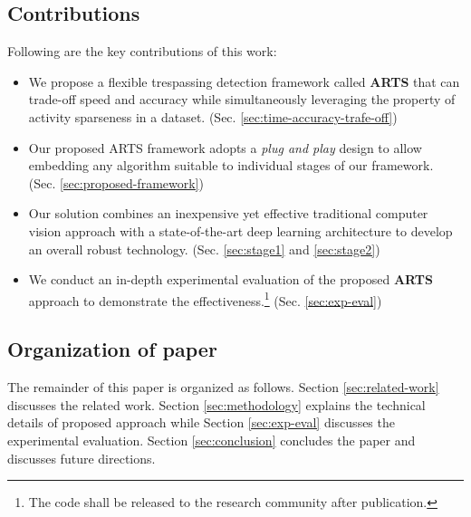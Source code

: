 \subsection{Contributions}
Following are the key contributions of this work:
\begin{itemize}
\item We propose a flexible trespassing detection framework called \textbf{ARTS} that can trade-off speed and accuracy while simultaneously leveraging the property of activity sparseness in a dataset. (Sec. \ref{sec:time-accuracy-trafe-off})

\item Our proposed ARTS framework adopts a \textit{plug and play} design to allow embedding any algorithm suitable to individual stages of our framework. (Sec. \ref{sec:proposed-framework})

\item Our solution combines an inexpensive yet effective traditional computer vision approach with a state-of-the-art deep learning architecture to develop an overall robust technology. (Sec. \ref{sec:stage1} and \ref{sec:stage2})

\item We conduct an in-depth experimental evaluation of the proposed \textbf{ARTS} approach to demonstrate the effectiveness.\footnote{The code shall be released to the research community after publication.} (Sec. \ref{sec:exp-eval})



\end{itemize}
\subsection{Organization of paper}
The remainder of this paper is organized as follows.  Section \ref{sec:related-work} discusses the related work. Section \ref{sec:methodology} explains the technical details of proposed approach while Section \ref{sec:exp-eval} discusses the experimental evaluation. Section \ref{sec:conclusion} concludes the paper and discusses future directions. 